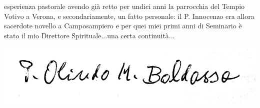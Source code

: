 esperienza pastorale avendo già retto per undici anni la parrocchia del Tempio Votivo a Verona, e secondariamente, un fatto personale: il P. Innocenzo era allora sacerdote novello a 
Camposampiero e per quei miei primi anni di Seminario è stato il mio Direttore Spirituale...una certa continuità...
\begin{flushright}
\includegraphics[scale=0.16]{immagini/firmaBaldassa.jpg}
\end{flushright}
